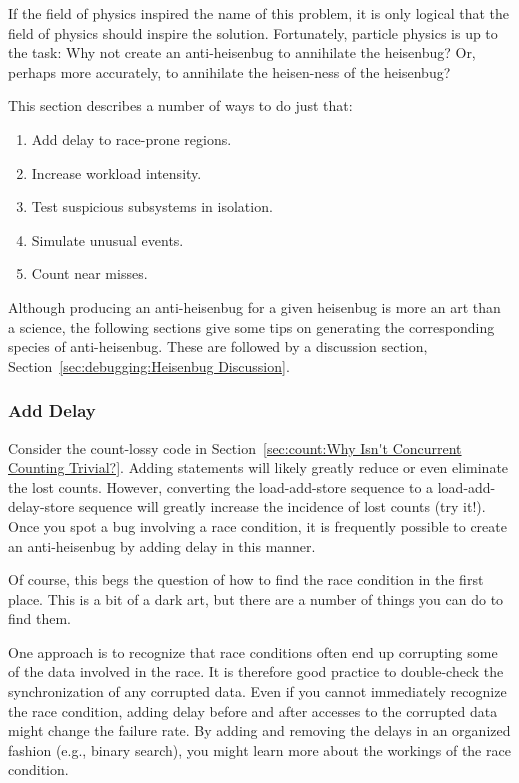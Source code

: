 If the field of physics inspired the name of this problem, it is only
logical that the field of physics should inspire the solution.
Fortunately, particle physics is up to the task:
Why not create an anti-heisenbug to annihilate the heisenbug?
Or, perhaps more accurately, to annihilate the heisen-ness of
the heisenbug?

This section describes a number of ways to do just that:

\begin{enumerate}
\item	Add delay to race-prone regions.
\item	Increase workload intensity.
\item	Test suspicious subsystems in isolation.
\item	Simulate unusual events.
\item	Count near misses.
\end{enumerate}

Although producing an anti-heisenbug for a given heisenbug is more an
art than a science, the following sections give some tips on
generating the corresponding species of anti-heisenbug.
These are followed by a discussion section,
Section~\ref{sec:debugging:Heisenbug Discussion}.

\subsubsection{Add Delay}
\label{sec:debugging:Add Delay}

Consider the count-lossy code in
Section~\ref{sec:count:Why Isn't Concurrent Counting Trivial?}.
Adding  statements will likely greatly reduce or even
eliminate the lost counts.
However, converting the load-add-store sequence to a load-add-delay-store
sequence will greatly increase the incidence of lost counts (try it!).
Once you spot a bug involving a race condition, it is frequently possible
to create an anti-heisenbug by adding delay in this manner.

Of course, this begs the question of how to find the race condition in
the first place.
This is a bit of a dark art, but there are a number of things you can
do to find them.

One approach is to recognize that race conditions often end up corrupting
some of the data involved in the race.
It is therefore good practice to double-check the synchronization of
any corrupted data.
Even if you cannot immediately recognize the race condition, adding
delay before and after accesses to the corrupted data might change
the failure rate.
By adding and removing the delays in an organized fashion (e.g., binary
search), you might learn more about the workings of the race condition.

